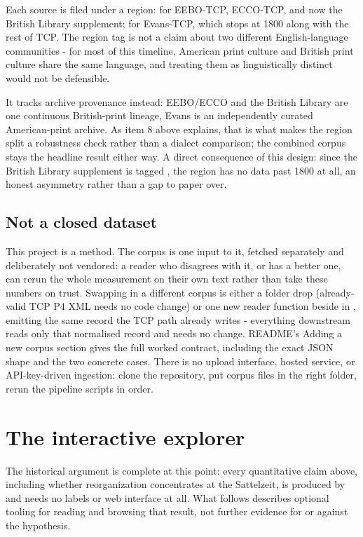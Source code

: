 \documentclass[11pt]{article}
\begin{document}
Each source is filed under a region:  for EEBO-TCP,
ECCO-TCP, and now the British Library supplement;  for
Evans-TCP, which stops at 1800 along with the rest of TCP. The region
tag is not a claim about two different English-language communities -
for most of this timeline, American print culture and British print
culture share the same language, and treating them as linguistically
distinct would not be defensible.

It tracks archive provenance instead:
EEBO/ECCO and the British Library are one continuous British-print
lineage, Evans is an independently curated American-print archive.
As item 8 above explains, that is what makes the region split a
robustness check rather than a dialect comparison; the combined corpus
stays the headline result either way. A direct consequence of this
design: since the British Library supplement is tagged ,
the  region has no data past 1800 at all, an honest
asymmetry rather than a gap to paper over.

\subsection{Not a closed dataset}

This project is a method. The corpus is one input to it, fetched
separately and deliberately not vendored: a reader who disagrees with
it, or has a better one, can rerun the whole measurement on their own
text rather than take these numbers on trust. Swapping in a different
corpus is either a folder drop (already-valid TCP P4 XML needs no code
change) or one new reader function beside  in
, emitting the same
 record the TCP path
already writes - everything downstream reads only that normalised
record and needs no change. README's Adding a new corpus section gives
the full worked contract, including the exact JSON shape and the two
concrete cases. There is no upload interface, hosted service, or
API-key-driven ingestion: clone the repository, put corpus files in the
right folder, rerun the pipeline scripts in order.

\section{The interactive explorer}
\label{sec:webapp}

The historical argument is complete at this point: every quantitative
claim above, including whether reorganization concentrates at the
Sattelzeit, is produced by  and needs no labels or
web interface at all. What follows describes optional tooling for
reading and browsing that result, not further evidence for or against
the hypothesis.
\end{document}
